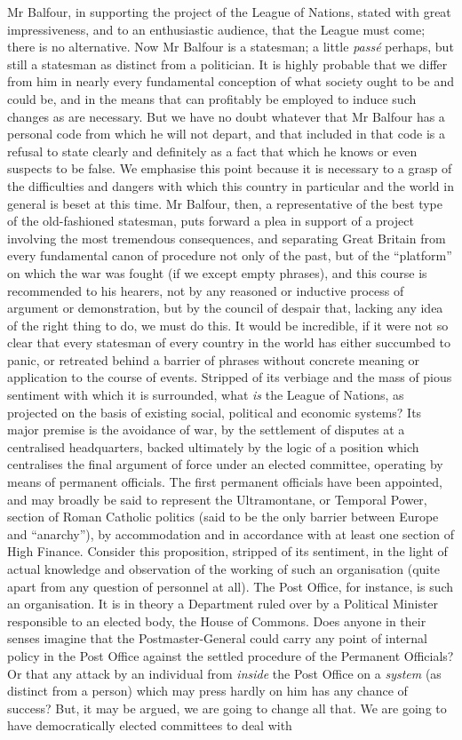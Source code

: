 \documentclass{book}
\begin{document}
Mr Balfour, in supporting the project of the League of Nations, stated with great impressiveness, and to an enthusiastic audience, that the League must come; there is no alternative. Now Mr Balfour is a statesman; a little \emph{passé} perhaps, but still a statesman as distinct from a politician. It is highly probable that we differ from him in nearly every fundamental conception of what society ought to be and could be, and in the means that can profitably be employed to induce such changes as are necessary. But we have no doubt whatever that Mr Balfour has a personal code from which he will not depart, and that included in that code is a refusal to state clearly and definitely as a fact that which he knows or even suspects to be false. We emphasise this point because it is necessary to a grasp of the difficulties and dangers with which this country in particular and the world in general is beset at this time. Mr Balfour, then, a representative of the best type of the old-fashioned statesman, puts forward a plea in support of a project involving the most tremendous consequences, and separating Great Britain from every fundamental canon of procedure not only of the past, but of the “platform” on which the war was fought (if we except empty phrases), and this course is recommended to his hearers, not by any reasoned or inductive process of argument or demonstration, but by the council of despair that, lacking any idea of the right thing to do, we must do this. It would be incredible, if it were not so clear that every statesman of every country in the world has either succumbed to panic, or retreated behind a barrier of phrases without concrete meaning or application to the course of events. Stripped of its verbiage and the mass of pious sentiment with which it is surrounded, what \emph{is} the League of Nations, as projected on the basis of existing social, political and economic systems? Its major premise is the avoidance of war, by the settlement of disputes at a centralised headquarters, backed ultimately by the logic of a position which centralises the final argument of force under an elected committee, operating by means of permanent officials. The first permanent officials have been appointed, and may broadly be said to represent the Ultramontane, or Temporal Power, section of Roman Catholic politics (said to be the only barrier between Europe and “anarchy”), by accommodation and in accordance with at least one section of High Finance. Consider this proposition, stripped of its sentiment, in the light of actual knowledge and observation of the working of such an organisation (quite apart from any question of personnel at all). The Post Office, for instance, is such an organisation. It is in theory a Department ruled over by a Political Minister responsible to an elected body, the House of Commons. Does anyone in their senses imagine that the Postmaster-General could carry any point of internal policy in the Post Office against the settled procedure of the Permanent Officials? Or that any attack by an individual from \emph{inside} the Post Office on a \emph{system} (as distinct from a person) which may press hardly on him has any chance of success? But, it may be argued, we are going to change all that. We are going to have democratically elected committees to deal with 
\end{document}
